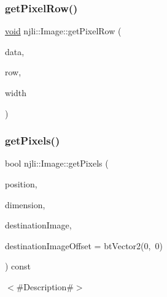 \mbox{\label{classnjli_1_1_image_a1d1a40ff4c30f776b445f3ac003de70e}} 
\subsubsection{\texorpdfstring{get\+Pixel\+Row()}{getPixelRow()}}
{\footnotesize\ttfamily \mbox{\hyperlink{_thread_8h_af1e856da2e658414cb2456cb6f7ebc66}{void}} njli\+::\+Image\+::get\+Pixel\+Row (\begin{DoxyParamCaption}\item[{\mbox{\hyperlink{_util_8h_aed742c436da53c1080638ce6ef7d13de}{u8}} $\ast$}]{data,  }\item[{\mbox{\hyperlink{_util_8h_a10e94b422ef0c20dcdec20d31a1f5049}{u32}}}]{row,  }\item[{\mbox{\hyperlink{_util_8h_a10e94b422ef0c20dcdec20d31a1f5049}{u32}}}]{width }\end{DoxyParamCaption})\hspace{0.3cm}{\ttfamily [protected]}}

\mbox{\label{classnjli_1_1_image_a8403c40ff10118ec972dd1b45942a520}} 
\subsubsection{\texorpdfstring{get\+Pixels()}{getPixels()}}
{\footnotesize\ttfamily bool njli\+::\+Image\+::get\+Pixels (\begin{DoxyParamCaption}\item[{const bt\+Vector2 \&}]{position,  }\item[{const bt\+Vector2 \&}]{dimension,  }\item[{\mbox{\hyperlink{classnjli_1_1_image}{Image}} \&}]{destination\+Image,  }\item[{const bt\+Vector2 \&}]{destination\+Image\+Offset = {\ttfamily btVector2(0,~0)} }\end{DoxyParamCaption}) const}

$<$\#\+Description\#$>$


